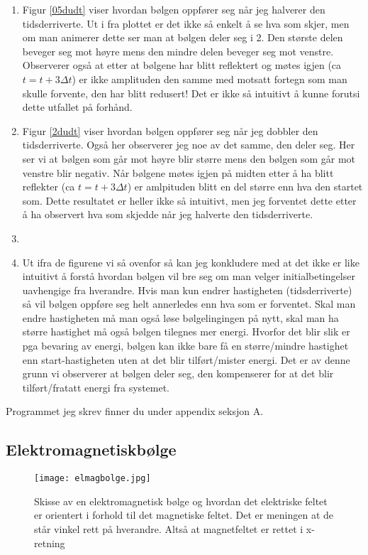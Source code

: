 \documentclass[a4paper,12pt,norsk]{article}
\begin{document}
\begin{enumerate}[label=(\alph*)]
\item
Figur \vref{05dudt} viser hvordan bølgen oppfører seg når jeg halverer den tidsderriverte. Ut i fra plottet er det ikke så enkelt å se hva som skjer, men om man animerer dette ser man at bølgen deler seg i 2. Den største delen beveger seg mot høyre mens den mindre delen beveger seg mot venstre. Observerer også at etter at bølgene har blitt reflektert og møtes igjen (ca $t = t + 3\Delta t$) er ikke amplituden den samme med motsatt fortegn som man skulle forvente, den har blitt redusert! Det er ikke så intuitivt å kunne forutsi dette utfallet på forhånd. 

\item
Figur \vref{2dudt} viser hvordan bølgen oppfører seg når jeg dobbler den tidsderriverte. Også her observerer jeg noe av det samme, den deler seg. Her ser vi at bølgen som går mot høyre blir større mens den bølgen som går mot venstre blir negativ. Når bølgene møtes igjen på midten etter å ha blitt reflekter (ca $t = t + 3\Delta t$) er amlpituden blitt en del større enn hva den startet som. Dette resultatet er heller ikke så intuitivt, men jeg forventet dette etter å ha observert hva som skjedde når jeg halverte den tidsderriverte. 

\item
\item
Ut ifra de figurene vi så ovenfor så kan jeg konkludere med at det ikke er like intuitivt å forstå hvordan bølgen vil bre seg om man velger initialbetingelser uavhengige fra hverandre. Hvis man kun endrer hastigheten (tidsderriverte) så vil bølgen oppføre seg helt annerledes enn hva som er forventet. Skal man endre hastigheten må man også løse bølgelingingen på nytt, skal man ha større hastighet må også bølgen tilegnes mer energi. Hvorfor det blir slik er pga bevaring av energi, bølgen kan ikke bare få en større/mindre hastighet enn start-hastigheten uten at det blir tilført/mister energi. Det er av denne grunn vi observerer at bølgen deler seg, den kompenserer for at det blir tilført/fratatt energi fra systemet. 
\end{enumerate}

Programmet jeg skrev finner du under appendix seksjon A.

\subsection{Elektromagnetiskbølge}

\begin{figure}
\texttt{[image: elmagbolge.jpg]} 
\caption[Skisse av elmag-bølge]{Skisse av en elektromagnetisk bølge og hvordan det elektriske feltet er orientert i forhold til det magnetiske feltet. Det er meningen at de står vinkel rett på hverandre. Altså at magnetfeltet er rettet i x-retning}
\label{elmag}
\end{figure}
\end{document}
